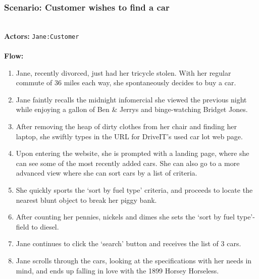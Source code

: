 \subsubsection{Scenario: Customer wishes to find a car}
\HRule \\[0.4cm]
\textbf{Actors:} \texttt{Jane:Customer}\\
\HRule \\[0.4cm]
\textbf{Flow:} \\
\begin{enumerate}
 \item Jane, recently divorced, just had her tricycle stolen. With her regular commute of 36 miles each way, she spontaneously decides to buy a car.
 \item Jane faintly recalls the midnight infomercial she viewed the previous night while enjoying a gallon of Ben \& Jerrys and binge-watching Bridget Jones.
 \item After removing the heap of dirty clothes from her chair and finding her laptop, she swiftly types in the URL for DriveIT's used car lot web page.
 \item Upon entering the website, she is prompted with a landing page, where she can see some of the most recently added cars. She can also go to a more advanced view where she can sort cars by a list of criteria.
 \item She quickly sports the `sort by fuel type' criteria, and proceeds to locate the nearest blunt object to break her piggy bank.
 \item After counting her pennies, nickels and dimes she sets the `sort by fuel type'-field to diesel.
 \item Jane continues to click the `search' button and receives the list of 3 cars.
 \item Jane scrolls through the cars, looking at the specifications with her needs in mind, and ends up falling in love with the 1899 Horsey Horseless.
\end{enumerate}
\HRule \\[0.4cm]
